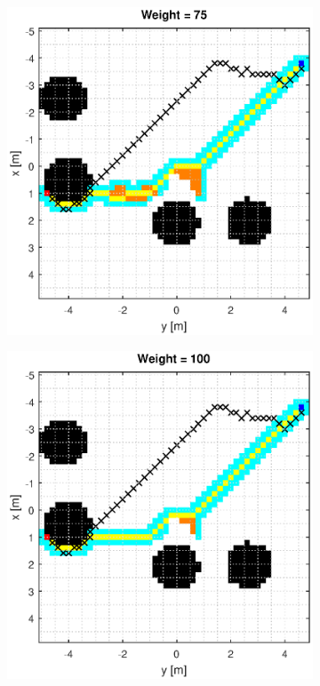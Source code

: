 \documentclass[Space3_Assign3.tex]{subfile}
\begin{document}
\begin{figure}
\begin{subfigure}{0.49\linewidth}
\end{subfigure}
\begin{subfigure}{0.49\linewidth}
\includegraphics[width = 1\linewidth]{Astar_man_75.eps}
\end{subfigure}
\begin{subfigure}{0.49\linewidth}
\includegraphics[width = 1\linewidth]{Astar_man_100.eps}
\end{subfigure}
\end{figure}
\end{document}
